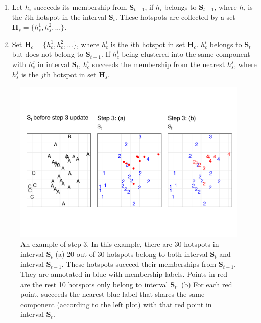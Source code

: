 \begin{enumerate}
\def\labelenumi{(\alph{enumi})}
\item
  Let \(h_i\) succeeds its membership from \(\boldsymbol{S}_{t-1}\), if
  \(h_i\) belongs to \(\boldsymbol{S}_{t-1}\), where \(h_i\) is the
  \(i\)th hotspot in the interval \(\boldsymbol{S}_t\). These hotspots
  are collected by a set \(\boldsymbol{H}_s = \{h_s^1,h_s^2,...\}\).
\item
  Set \(\boldsymbol{H}_c = \{h_c^1,h_c^2,...\}\), where \(h_c^i\) is the
  \(i\)th hotspot in set \(\boldsymbol{H}_c\). \(h_c^i\) belongs to
  \(\boldsymbol{S}_t\) but does not belong to \(\boldsymbol{S}_{t-1}\).
  If \(h_c^i\) being clustered into the same component with \(h_s^j\) in
  interval \(\boldsymbol{S}_t\), \(h_c^i\) succeeds the membership from
  the nearest \(h_s^j\), where \(h_s^j\) is the \(j\)th hotspot in set
  \(\boldsymbol{H}_s\).
\end{enumerate}

\begin{Schunk}
\begin{figure}

{\centering \includegraphics[width=0.8\linewidth]{clustering_paper_files/figure-latex/step3figs-1} 

}

\caption{An example of step 3. In this example, there are 30 hotspots in interval $\boldsymbol{S}_t$ (a) 20 out of 30 hotspots belong to both interval $\boldsymbol{S}_t$ and interval $\boldsymbol{S}_{t-1}$. These hotspots succeed their memberships from $\boldsymbol{S}_{t-1}$. They are annotated in blue with membership labels. Points in red are the rest 10 hotspots only belong to interval $\boldsymbol{S}_t$. (b) For each red point, succeeds the nearest blue label that shares the same component (according to the left plot) with that red point in interval $\boldsymbol{S}_t$. }\label{fig:step3figs}
\end{figure}
\end{Schunk}

